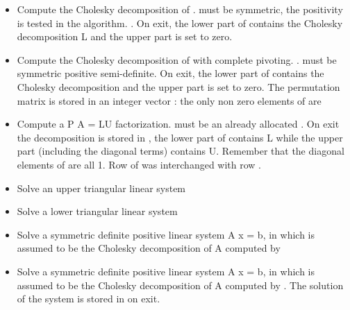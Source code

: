 \begin{itemize}
\item {}
  \sshortdescribe Compute the Cholesky decomposition of .  must
  be symmetric, the positivity is tested in the algorithm.  .
  On exit, the lower part of  contains the Cholesky decomposition L and
  the upper part is set to zero. 

\item {}
    \sshortdescribe Compute the
    Cholesky decomposition of  with complete pivoting. 
    .
     must be
    symmetric positive semi-definite. On exit, the lower part of 
    contains the Cholesky decomposition  and the upper part is set to zero. The
    permutation matrix is stored in an integer vector  : the only non
    zero elements of  are 

\item {} 
  \sshortdescribe Compute a P A = LU factorization.  must be an
  already allocated  \PnlPermutation. On exit the decomposition is
  stored in , the lower part of  contains L while the upper part
  (including the diagonal terms) contains U. Remember that the diagonal
  elements of  are all 1. Row  of  was interchanged with
  row .
  
\item {}
  \sshortdescribe Solve an upper triangular linear system 

\item {}
  \sshortdescribe Solve a lower triangular linear system  
  
\item {} 
  \sshortdescribe Solve a symmetric definite positive linear system A x = b, 
  in which  is assumed to be the Cholesky decomposition of A
  computed by 

\item {} 
  \sshortdescribe Solve a symmetric definite positive linear system A x = b, 
  in which  is assumed to be the Cholesky decomposition of A
  computed by . The solution of the system is stored in
   on exit.


\end{itemize}

